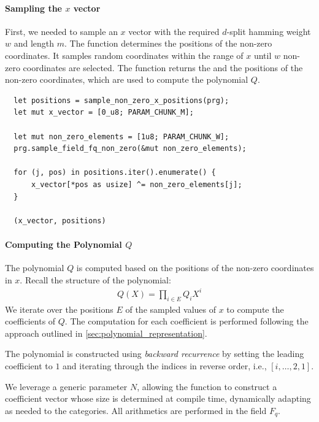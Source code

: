 \documentclass[11pt]{report}
\theoremstyle{definition}
\theoremstyle{plain}
\begin{document}
\paragraph{Sampling the $x$ vector}

First, we needed to sample an $x$ vector with the required $d$-split hamming weight $w$ and length $m$. The function  determines the positions of the non-zero coordinates. It samples random coordinates within the range of $x$ until $w$ non-zero coordinates are selected. The function returns the  and the positions of the non-zero coordinates, which are used to compute the polynomial $Q$.

\begin{verbatim}
  let positions = sample_non_zero_x_positions(prg);
  let mut x_vector = [0_u8; PARAM_CHUNK_M];
  
  let mut non_zero_elements = [1u8; PARAM_CHUNK_W];
  prg.sample_field_fq_non_zero(&mut non_zero_elements);

  for (j, pos) in positions.iter().enumerate() {
      x_vector[*pos as usize] ^= non_zero_elements[j];
  }

  (x_vector, positions)
\end{verbatim}

\paragraph{Computing the Polynomial $Q$}

The polynomial $Q$ is computed based on the positions of the non-zero coordinates in $x$. Recall the structure of the polynomial:
\begin{align*}
  Q(X) = \prod_{i\in E} Q_i X^i
\end{align*}
We iterate over the positions $E$ of the sampled values of $x$ to compute the coefficients of $Q$. The computation for each coefficient is performed following the approach outlined in \autoref{sec:polynomial_representation}.

The polynomial is constructed using \textit{backward recurrence} by setting the leading coefficient to $1$ and iterating through the indices in reverse order, i.e., $[i, \dots, 2, 1]$.

We leverage a generic parameter $N$, allowing the function to construct a coefficient vector whose size is determined at compile time, dynamically adapting as needed to the categories. All arithmetics are performed in the field $F_q$.
\end{document}
